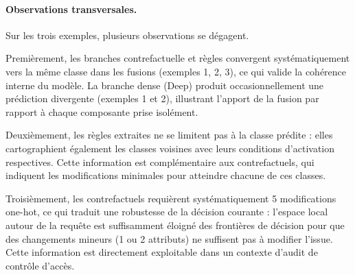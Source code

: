 \documentclass[12pt,a4paper]{article}
\begin{document}

\paragraph{Observations transversales.}
Sur les trois exemples, plusieurs observations se dégagent.

Premièrement, les branches contrefactuelle et règles convergent systématiquement
vers la même classe dans les fusions (exemples 1, 2, 3), ce qui valide la
cohérence interne du modèle. La branche dense (Deep) produit occasionnellement
une prédiction divergente (exemples 1 et 2), illustrant l'apport de la fusion
par rapport à chaque composante prise isolément.

Deuxièmement, les règles extraites ne se limitent pas à la classe prédite :
elles cartographient également les classes voisines avec leurs conditions
d'activation respectives. Cette information est complémentaire aux contrefactuels,
qui indiquent les modifications minimales pour atteindre chacune de ces classes.

Troisièmement, les contrefactuels requièrent systématiquement 5 modifications
one-hot, ce qui traduit une robustesse de la décision courante : l'espace local
autour de la requête est suffisamment éloigné des frontières de décision pour
que des changements mineurs (1 ou 2 attributs) ne suffisent pas à modifier
l'issue. Cette information est directement exploitable dans un contexte d'audit
de contrôle d'accès.
\end{document}
